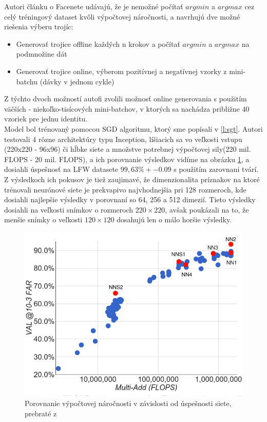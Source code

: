 Autori článku\cite{schroff2015facenet} o Facenete udávajú, že je nemožné počítať $ argmin $ a $ argmax $ cez celý tréningový dataset kvôli výpočtovej náročnosti, a navrhujú dve možné riešenia výberu trojíc:

\begin{itemize}
	\item Generovať trojice offline každých n krokov a počítať $ argmin $ a $ argmax $ na podmnožine dát
	\item Generovať trojice online, výberom pozitívnej a negatívnej vzorky z mini-batchu (dávky v jednom cykle) 
\end{itemize}

\indent Z týchto dvoch možností autofi zvolili možnosť online generovania s použitím väčších - niekoľko-tisícových mini-batchov, v ktorých sa nachádza približne 40 vzoriek pre jednu identitu. \\

\indent Model bol trénovaný pomocou SGD algoritmu, ktorý sme popísali v \ref{l:sgt}.
Autori testovali 4 rôzne architektúry typu Inception, líšiacich sa vo veľkosti vstupu (220x220 - 96x96) či hĺbke siete a množstve potrebnej výpočtovej sily(220 mil. FLOPS - 20 mil. FLOPS), a ich porovnanie výsledkov vidíme na obrázku \ref{fig:facenetflops}, a dosiahli úspešnosť na LFW datasete $ 99,63\% +- 0.09 $ s použitím zarovnani tvárí.
Z výsledkoch ich pokusov je tiež zaujimavé, že dimenzionalita príznakov na ktoré trénovali neurónové siete je prekvapivo najvhodnejšia pri 128 rozmeroch, kde dosiahli najlepšie výsledky v porovnaní so 64, 256 a 512 dimezií.
Tieto výsledky dosiahli na veľkosti snímkov o rozmeroch $ 220 \times 220 $, avšak poukázali na to, že menšie snímky o veľkosti $ 120 \times 120 $ dosahujú len o málo horšie výsledky.

\begin{figure}[H]
	\centering
	\includegraphics[width=.75\linewidth]{img/facenetflops}
	\caption{Porovnanie výpočtovej náročnosti v závislosti od úspešnosti siete, prebraté z\cite[s.~5]{schroff2015facenet}}
	\label{fig:facenetflops}
\end{figure}

